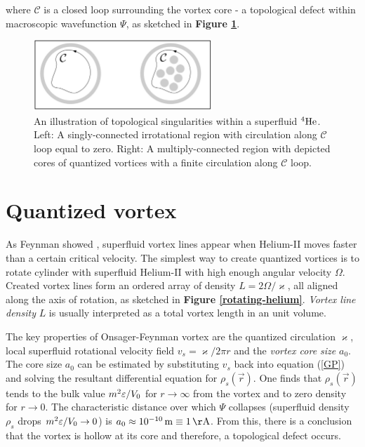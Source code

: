 where $\mathcal{C}$ is a closed loop surrounding the vortex core - a topological defect within macroscopic wavefunction $\Psi$, as sketched in \textbf{Figure \ref{singularity}}.

\begin{figure}[h]
	\centering
	\includegraphics[width=0.6\textwidth]{graphics/theory/singularity}
	\caption{An illustration of topological singularities within a superfluid ${}^4\mathrm{He}$. Left: A singly-connected irrotational region with circulation along $\mathcal{C}$ loop equal to zero. Right: A multiply-connected region with depicted cores of quantized vortices with a finite circulation along $\mathcal{C}$ loop.}
	\label{singularity}
\end{figure}


\section{Quantized vortex}

As Feynman showed \cite{feynman}, superfluid vortex lines appear when Helium-II moves faster than a certain critical velocity. The simplest way to create quantized vortices is to rotate cylinder with superfluid Helium-II with high enough angular velocity $\Omega$. Created vortex lines form an ordered array of density $L=2\Omega / \varkappa$, all aligned along the axis of rotation, as sketched in \textbf{Figure \ref{rotating-helium}}. \textit{Vortex line density} $L$ is usually interpreted as a total vortex length in an unit volume.

The key properties of Onsager-Feynman vortex \cite{onsager} are the quantized circulation $\varkappa$, local superfluid rotational velocity field $v_s = \varkappa / 2\pi r$ and the \textit{vortex core size} $a_0$. The core size $a_0$ can be estimated by substituting $v_s$ back into equation (\ref{GP}) and solving the resultant differential equation for $\rho_s (\vec{r})$. One finds that $\rho_s (\vec{r})$ tends to the bulk value $m^2 \varepsilon / V_0$ for $r \rightarrow \infty$ from the vortex and to zero density for $r \rightarrow 0$.
The characteristic distance over which $\Psi$ collapses (superfluid density $\rho_s$ drops $m^2 \varepsilon / V_0 \rightarrow 0$) is $a_0 \approx 10^{-10} \unit{m} \equiv 1 \unit{\AA}$. From this, there is a conclusion that the vortex is hollow at its core and therefore, a topological defect occurs.

